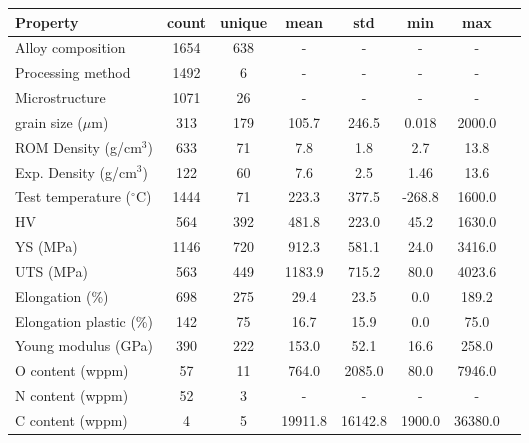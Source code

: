 \begin{tabular}{lccccccc}
\toprule
Property & count & unique & mean & std & min & max \\
\midrule
Alloy composition & 1654 & 638 & - & - & - & - \\
Processing method & 1492 & 6 & - & - & - & - \\
Microstructure & 1071 & 26 & - & - & - & - \\
grain size ($\mu$m) & 313 & 179 & 105.7 & 246.5 & 0.018 & 2000.0 \\
ROM Density (g/cm$^3$) & 633 & 71 & 7.8 & 1.8 & 2.7 & 13.8 \\
Exp. Density (g/cm$^3$) & 122 & 60 & 7.6 & 2.5 & 1.46 & 13.6 \\
Test temperature ($^\circ$C) & 1444 & 71 & 223.3 & 377.5 & -268.8 & 1600.0 \\
HV & 564 & 392 & 481.8 & 223.0 & 45.2 & 1630.0 \\
YS (MPa) & 1146 & 720 & 912.3 & 581.1 & 24.0 & 3416.0 \\
UTS (MPa) & 563 & 449 & 1183.9 & 715.2 & 80.0 & 4023.6 \\
Elongation (\%) & 698 & 275 & 29.4 & 23.5 & 0.0 & 189.2 \\
Elongation plastic (\%) & 142 & 75 & 16.7 & 15.9 & 0.0 & 75.0 \\
Young modulus (GPa) & 390 & 222 & 153.0 & 52.1 & 16.6 & 258.0 \\
O content (wppm) & 57 & 11 & 764.0 & 2085.0 & 80.0 & 7946.0 \\
N content (wppm) & 52 & 3 & - & - & - & - \\
C content (wppm) & 4 & 5 & 19911.8 & 16142.8 & 1900.0 & 36380.0 \\
\bottomrule
\end{tabular}
